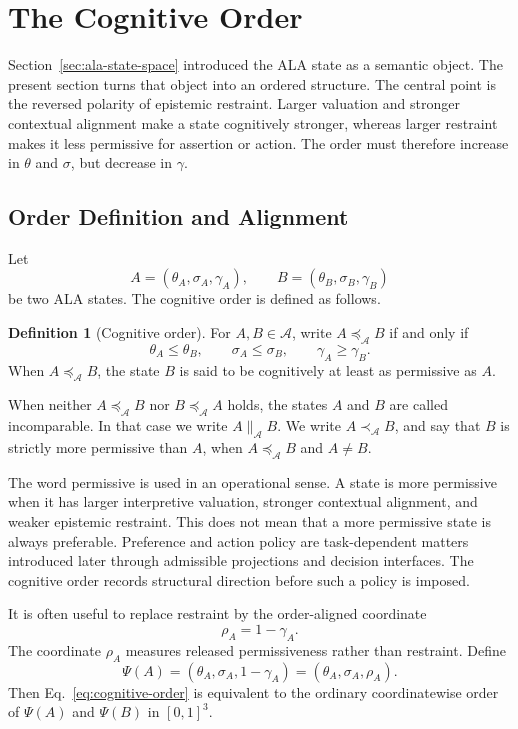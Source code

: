 \documentclass[reqno,final]{amsart}
\theoremstyle{definition}
\newtheorem{definition}{Definition}
\theoremstyle{plain}
\theoremstyle{remark}
\providecommand{\cA}{\mathcal{A}}
\providecommand{\preceqA}{\preceq_{\mathcal A}}
\providecommand{\precA}{\prec_{\mathcal A}}
\providecommand{\parallelA}{\parallel_{\mathcal A}}
\begin{document}
\section{The Cognitive Order}
\label{sec:cognitive-order}

Section~\ref{sec:ala-state-space} introduced the ALA state as a semantic object. The present section turns that object into an ordered structure. The central point is the reversed polarity of epistemic restraint. Larger valuation and stronger contextual alignment make a state cognitively stronger, whereas larger restraint makes it less permissive for assertion or action. The order must therefore increase in \(\theta\) and \(\sigma\), but decrease in \(\gamma\).

\subsection{Order Definition and Alignment}
Let
\[
A=(\theta_A,\sigma_A,\gamma_A),\qquad
B=(\theta_B,\sigma_B,\gamma_B)
\]
be two ALA states. The cognitive order is defined as follows.

\begin{definition}[Cognitive order]
For \(A,B\in\cA\), write \(A\preceqA B\) if and only if
\begin{equation}
\theta_A\leq \theta_B,\qquad
\sigma_A\leq \sigma_B,\qquad
\gamma_A\geq \gamma_B.
\label{eq:cognitive-order}
\end{equation}
When \(A\preceqA B\), the state \(B\) is said to be cognitively at least as permissive as \(A\).
\end{definition}

When neither \(A\preceqA B\) nor \(B\preceqA A\) holds, the states \(A\) and \(B\) are called incomparable. In that case we write \(A\parallelA B\). We write \(A\precA B\), and say that \(B\) is strictly more permissive than \(A\), when \(A\preceqA B\) and \(A\neq B\).

The word permissive is used in an operational sense. A state is more permissive when it has larger interpretive valuation, stronger contextual alignment, and weaker epistemic restraint. This does not mean that a more permissive state is always preferable. Preference and action policy are task-dependent matters introduced later through admissible projections and decision interfaces. The cognitive order records structural direction before such a policy is imposed.

It is often useful to replace restraint by the order-aligned coordinate
\[
\rho_A=1-\gamma_A.
\]
The coordinate \(\rho_A\) measures released permissiveness rather than restraint. Define
\begin{equation}
\Psi(A)=(\theta_A,\sigma_A,1-\gamma_A)=(\theta_A,\sigma_A,\rho_A).
\label{eq:psi-map-section4}
\end{equation}
Then Eq.~\eqref{eq:cognitive-order} is equivalent to the ordinary coordinatewise order of \(\Psi(A)\) and \(\Psi(B)\) in \([0,1]^3\).
\end{document}
